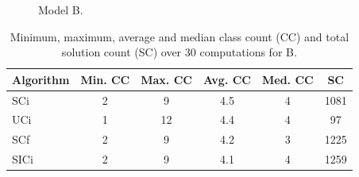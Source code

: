 \documentclass[a4paper, 12pt]{scrartcl}
\begin{document}
\clearpage

\begin{figure}
\centering
{}%
\hfill
{}%
\caption{Model B.}
\end{figure}

\begin{table}%
\centering
\begin{tabular}{lccccc}
Algorithm & Min. CC & Max. CC & Avg. CC & Med. CC & SC\\
\hline
SCi & 2 & 9 & 4.5 & 4 & 1081\\
UCi & 1 & 12 & 4.4 & 4 & 97\\
SCf & 2 & 9 & 4.2 & 3 & 1225\\
SICi & 2 & 9 & 4.1 & 4 & 1259
\end{tabular}
\caption{Minimum, maximum, average and median class count (CC) and total solution count (SC) over 30 computations for B.}
\label{}
\end{table}

\clearpage
\end{document}
